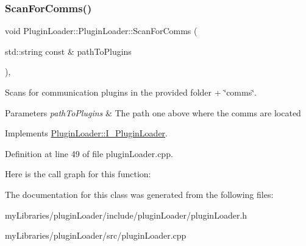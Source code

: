 \subsubsection{\texorpdfstring{ScanForComms()}{ScanForComms()}}
{\footnotesize\ttfamily void Plugin\+Loader\+::\+Plugin\+Loader\+::\+Scan\+For\+Comms (\begin{DoxyParamCaption}\item[{std\+::string const \&}]{path\+To\+Plugins }\end{DoxyParamCaption})\hspace{0.3cm}{\ttfamily [override]}, {\ttfamily [virtual]}}



Scans for communication plugins in the provided folder + \char`\"{}comms\char`\"{}. 


\begin{DoxyParams}{Parameters}
{\em path\+To\+Plugins} & The path one above where the comms are located \\
\hline
\end{DoxyParams}


Implements \mbox{\hyperlink{classPluginLoader_1_1I__PluginLoader}{Plugin\+Loader\+::\+I\+\_\+\+Plugin\+Loader}}.



Definition at line 49 of file plugin\+Loader.\+cpp.

Here is the call graph for this function\+:


The documentation for this class was generated from the following files\+:\begin{DoxyCompactItemize}
\item 
my\+Libraries/plugin\+Loader/include/plugin\+Loader/plugin\+Loader.\+h\item 
my\+Libraries/plugin\+Loader/src/plugin\+Loader.\+cpp\end{DoxyCompactItemize}

